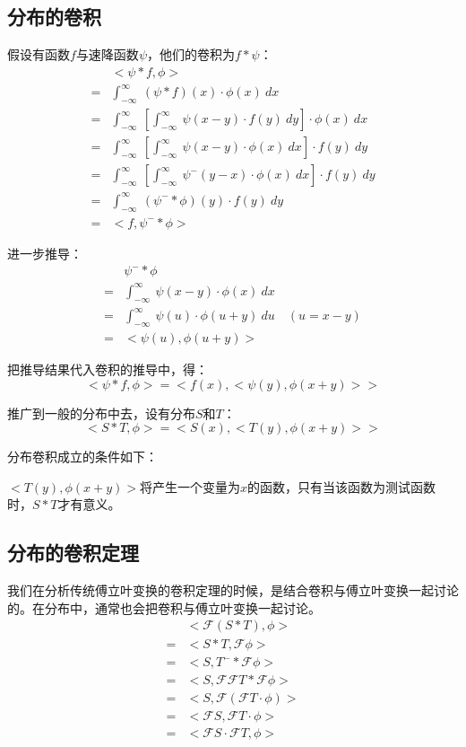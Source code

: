 \subsection{分布的卷积}
假设有函数$f$与速降函数$\psi$，他们的卷积为$f*\psi$：
\begin{align*}
	  & <\psi*f,\phi>                                                                                  \\
	= & \int_{-\infty}^{\infty}\ (\psi*f)(x)\cdot \phi(x)\ dx                                          \\
	= & \int_{-\infty}^{\infty}\ [\int_{-\infty}^{\infty}\ \psi(x-y)\cdot f(y)\ dy]\cdot \phi(x)\ dx   \\
	= & \int_{-\infty}^{\infty}\ [\int_{-\infty}^{\infty}\ \psi(x-y)\cdot \phi(x)\ dx]\cdot f(y)\ dy   \\
	= & \int_{-\infty}^{\infty}\ [\int_{-\infty}^{\infty}\ \psi^-(y-x)\cdot \phi(x)\ dx]\cdot f(y)\ dy \\
	= & \int_{-\infty}^{\infty}\ (\psi^-*\phi)(y)\cdot f(y)\ dy                                        \\
	= & <f,\psi^-*\phi>
\end{align*}

进一步推导：
\begin{align*}
	  & \psi^-*\phi                                                       \\
	= & \int_{-\infty}^{\infty}\ \psi(x-y)\cdot \phi(x)\ dx               \\
	= & \int_{-\infty}^{\infty}\ \psi(u)\cdot \phi(u+y)\ du \quad (u=x-y) \\
	= & <\psi(u),\phi(u+y)>
\end{align*}

把推导结果代入卷积的推导中，得：
$$
	<\psi*f,\phi>=<f(x),<\psi(y),\phi(x+y)>>
$$

推广到一般的分布中去，设有分布$S$和$T$：
\begin{equation}
	<S*T,\phi>=<S(x),<T(y),\phi(x+y)>>
\end{equation}

分布卷积成立的条件如下：

$<T(y),\phi(x+y)>$将产生一个变量为$x$的函数，只有当该函数为测试函数时，$S*T$才有意义。
\subsection{分布的卷积定理}
我们在分析传统傅立叶变换的卷积定理的时候，是结合卷积与傅立叶变换一起讨论的。在分布中，通常也会把卷积与傅立叶变换一起讨论。
\begin{align*}
	  & <\mathcal{F}(S*T),\phi>                     \\
	= & <S*T,\mathcal{F}\phi>                       \\
	= & <S,T^-*\mathcal{F}\phi>                     \\
	= & <S,\mathcal{F}\mathcal{F}T*\mathcal{F}\phi> \\
	= & <S,\mathcal{F}(\mathcal{F}T\cdot \phi)>     \\
	= & <\mathcal{F}S,\mathcal{F}T\cdot \phi>       \\
	= & <\mathcal{F}S\cdot \mathcal{F}T,\phi>
\end{align*}

